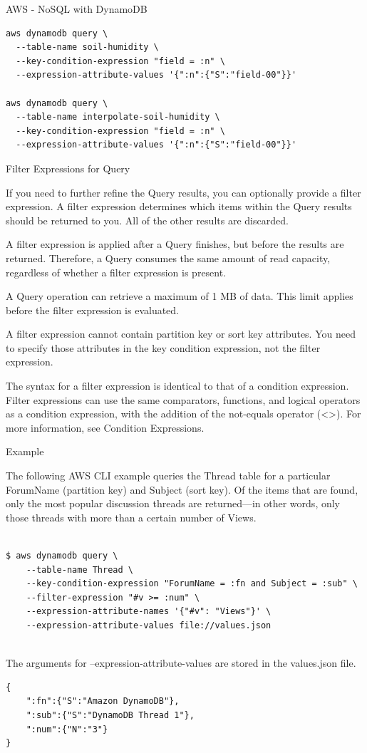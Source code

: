 \begin{frame}{AWS - NoSQL with DynamoDB}
\begin{lstlisting}
aws dynamodb query \
  --table-name soil-humidity \
  --key-condition-expression "field = :n" \
  --expression-attribute-values '{":n":{"S":"field-00"}}'

aws dynamodb query \
  --table-name interpolate-soil-humidity \
  --key-condition-expression "field = :n" \
  --expression-attribute-values '{":n":{"S":"field-00"}}'
\end{lstlisting}

Filter Expressions for Query

If you need to further refine the Query results, you can optionally provide a filter expression. A filter expression determines which items within the Query results should be returned to you. All of the other results are discarded.

A filter expression is applied after a Query finishes, but before the results are returned. Therefore, a Query consumes the same amount of read capacity, regardless of whether a filter expression is present.

A Query operation can retrieve a maximum of 1 MB of data. This limit applies before the filter expression is evaluated.

A filter expression cannot contain partition key or sort key attributes. You need to specify those attributes in the key condition expression, not the filter expression.

The syntax for a filter expression is identical to that of a condition expression. Filter expressions can use the same comparators, functions, and logical operators as a condition expression, with the addition of the not-equals operator (<>). For more information, see Condition Expressions.

Example

The following AWS CLI example queries the Thread table for a particular ForumName (partition key) and Subject (sort key). Of the items that are found, only the most popular discussion threads are returned—in other words, only those threads with more than a certain number of Views. 

\begin{lstlisting}

$ aws dynamodb query \
    --table-name Thread \
    --key-condition-expression "ForumName = :fn and Subject = :sub" \
    --filter-expression "#v >= :num" \
    --expression-attribute-names '{"#v": "Views"}' \
    --expression-attribute-values file://values.json
 
\end{lstlisting}
The arguments for --expression-attribute-values are stored in the values.json file. 
\begin{lstlisting}
{
    ":fn":{"S":"Amazon DynamoDB"},
    ":sub":{"S":"DynamoDB Thread 1"},
    ":num":{"N":"3"}
}
\end{lstlisting}

\end{frame}

